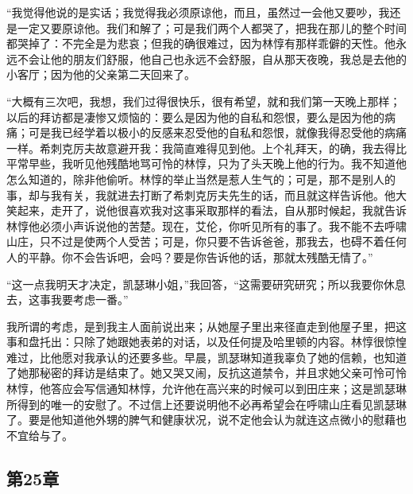\par “我觉得他说的是实话；我觉得我必须原谅他，而且，虽然过一会他又要吵，我还是一定又要原谅他。我们和解了；可是我们两个人都哭了，把我在那儿的整个时间都哭掉了：不完全是为悲哀；但我的确很难过，因为林惇有那样乖僻的天性。他永远不会让他的朋友们舒服，他自己也永远不会舒服，自从那天夜晚，我总是去他的小客厅；因为他的父亲第二天回来了。
\par “大概有三次吧，我想，我们过得很快乐，很有希望，就和我们第一天晚上那样；以后的拜访都是凄惨又烦恼的：要么是因为他的自私和怨恨，要么是因为他的病痛；可是我已经学着以极小的反感来忍受他的自私和怨恨，就像我得忍受他的病痛一样。希刺克厉夫故意避开我：我简直难得见到他。上个礼拜天，的确，我去得比平常早些，我听见他残酷地骂可怜的林惇，只为了头天晚上他的行为。我不知道他怎么知道的，除非他偷听。林惇的举止当然是惹人生气的；可是，那不是别人的事，却与我有关，我就进去打断了希刺克厉夫先生的话，而且就这样告诉他。他大笑起来，走开了，说他很喜欢我对这事采取那样的看法，自从那时候起，我就告诉林惇他必须小声诉说他的苦楚。现在，艾伦，你听见所有的事了。我不能不去呼啸山庄，只不过是使两个人受苦；可是，你只要不告诉爸爸，那我去，也碍不着任何人的平静。你不会告诉吧，会吗？要是你告诉他的话，那就太残酷无情了。”
\par “这一点我明天才决定，凯瑟琳小姐，”我回答，“这需要研究研究；所以我要你休息去，这事我要考虑一番。”
\par 我所谓的考虑，是到我主人面前说出来；从她屋子里出来径直走到他屋子里，把这事和盘托出：只除了她跟她表弟的对话，以及任何提及哈里顿的内容。林惇很惊惶难过，比他愿对我承认的还要多些。早晨，凯瑟琳知道我辜负了她的信赖，也知道了她那秘密的拜访是结束了。她又哭又闹，反抗这道禁令，并且求她父亲可怜可怜林惇，他答应会写信通知林惇，允许他在高兴来的时候可以到田庄来；这是凯瑟琳所得到的唯一的安慰了。不过信上还要说明他不必再希望会在呼啸山庄看见凯瑟琳了。要是他知道他外甥的脾气和健康状况，说不定他会认为就连这点微小的慰藉也不宜给与了。


\subsection{第25章}

